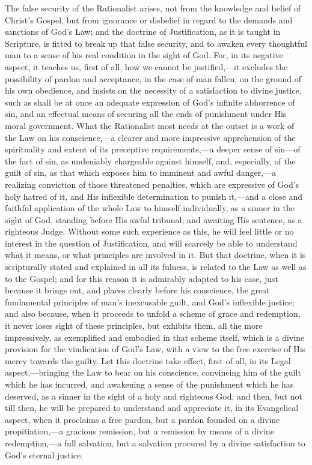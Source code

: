 \documentclass[
]{book}
\begin{document}
The false security of the Rationalist arises, not from the knowledge and belief of Christ's Gospel, but from ignorance or disbelief in regard to the demands and sanctions of God's Law; and the doctrine of Justification, as it is taught in Scripture, is fitted to break up that false security, and to awaken every thoughtful man to a sense of his real condition in the sight of God. For, in its negative aspect, it teaches us, first of all, how we cannot be justified,---it excludes the possibility of pardon and acceptance, in the case of man fallen, on the ground of his own obedience, and insists on the necessity of a satisfaction to divine justice, such as shall be at once an adequate expression of God's infinite abhorrence of sin, and an effectual means of securing all the ends of punishment under His moral government. What the Rationalist most needs at the outset is a work of the Law on his conscience,---a clearer and more impressive apprehension of the spirituality and extent of its preceptive requirements,---a deeper sense of sin---of the fact of sin, as undeniably chargeable against himself, and, especially, of the guilt of sin, as that which exposes him to imminent and awful danger,---a realizing conviction of those threatened penalties, which are expressive of God's holy hatred of it, and His inflexible determination to punish it,---and a close and faithful application of the whole Law to himself individually, as a sinner in the sight of God, standing before His awful tribunal, and awaiting His sentence, as a righteous Judge. Without some such experience as this, he will feel little or no interest in the question of Justification, and will scarcely be able to understand what it means, or what principles are involved in it. But that doctrine, when it is scripturally stated and explained in all its fulness, is related to the Law as well as to the Gospel; and for this reason it is admirably adapted to his case, just because it brings out, and places clearly before his conscience, the great fundamental principles of man's inexcusable guilt, and God's inflexible justice; and also because, when it proceeds to unfold a scheme of grace and redemption, it never loses sight of these principles, but exhibits them, all the more impressively, as exemplified and embodied in that scheme itself, which is a divine provision for the vindication of God's Law, with a view to the free exercise of His mercy towards the guilty. Let this doctrine take effect, first of all, in its Legal aspect,---bringing the Law to bear on his conscience, convincing him of the guilt which he has incurred, and awakening a sense of the punishment which he has deserved, as a sinner in the sight of a holy and righteous God; and then, but not till then, he will be prepared to understand and appreciate it, in its Evangelical aspect, when it proclaims a free pardon, but a pardon founded on a divine propitiation,---a gracious remission, but a remission by means of a divine redemption,---a full salvation, but a salvation procured by a divine satisfaction to God's eternal justice.
\end{document}
